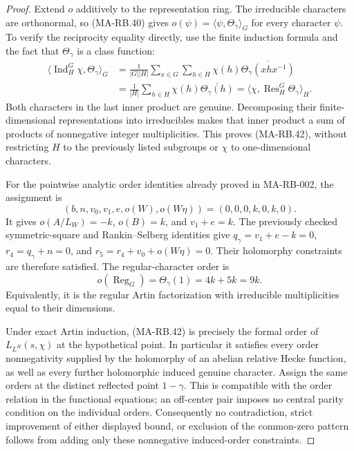 \begin{proof}
Extend $o$ additively to the representation ring.  The
irreducible characters are orthonormal, so (MA-RB.40) gives
$o(\psi)=\langle\psi,\Theta_\gamma\rangle_G$ for every
character $\psi$.  To verify the reciprocity equality directly,
use the finite induction formula and the fact that
$\Theta_\gamma$ is a class function:
\[
 \begin{aligned}
 \langle\operatorname{Ind}_H^G\chi,\Theta_\gamma\rangle_G
 &=\frac1{|G||H|}\sum_{x\in G}\sum_{h\in H}
                   \chi(h)\overline{\Theta_\gamma(xhx^{-1})}\\
 &=\frac1{|H|}\sum_{h\in H}
                   \chi(h)\overline{\Theta_\gamma(h)}
  =\langle\chi,\operatorname{Res}_H^G\Theta_\gamma\rangle_H .
 \end{aligned}
 \tag{MA-RB.43}
\]
Both characters in the last inner product are genuine.
Decomposing their finite-dimensional representations into
irreducibles makes that inner product a sum of products
of nonnegative integer multiplicities.  This proves
(MA-RB.42), without restricting $H$ to the previously
listed subgroups or $\chi$ to one-dimensional characters.

For the pointwise analytic order identities already proved
in MA-RB-002, the assignment is
\[
 (b,n,v_0,v_1,e,o(W),o(W\eta))=(0,0,0,k,0,k,0).
 \tag{MA-RB.44}
\]
It gives $o(A/L_W)=-k$, $o(B)=k$, and
$v_1+e=k$.  The previously checked symmetric-square
and Rankin--Selberg identities give
$q_\gamma=v_1+e-k=0$, $r_4=q_\gamma+n=0$, and
$r_5=r_4+v_0+o(W\eta)=0$.  Their holomorphy constraints
are therefore satisfied.  The regular-character order is
\[
 o(\operatorname{Reg}_G)
    =\Theta_\gamma(1)=4k+5k=9k.
 \tag{MA-RB.45}
\]
Equivalently, it is the regular Artin factorization with
irreducible multiplicities equal to their dimensions.

Under exact Artin induction, (MA-RB.42) is precisely the
formal order of $L_{L^H}(s,\chi)$ at the hypothetical
point.  In particular it satisfies every order
nonnegativity supplied by the holomorphy of an abelian
relative Hecke function, as well as every further
holomorphic induced genuine character.  Assign the same
orders at the distinct reflected point $1-\gamma$.
This is compatible with the order relation in the functional
equations; an off-center pair imposes no central parity
condition on the individual orders.  Consequently no
contradiction, strict improvement of either displayed bound,
or exclusion of the common-zero pattern follows from adding
only these nonnegative induced-order constraints.
\end{proof}

